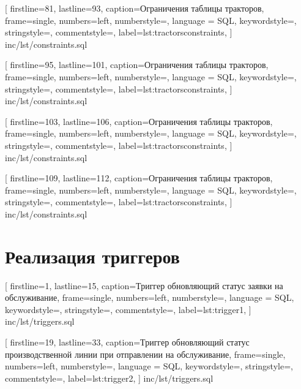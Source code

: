 
[
    firstline=81,
    lastline=93,
    caption=Ограничения таблицы тракторов,
    frame=single,
    numbers=left,
	numberstyle=\footnotesize\color{numbers},
    language = SQL,
    keywordstyle=\color{keywords},
	stringstyle=\color{strings},
	commentstyle=\color{comments},
    label={lst:tractorsconstraints},
]
{inc/lst/constraints.sql}


[
    firstline=95,
    lastline=101,
    caption=Ограничения таблицы тракторов,
    frame=single,
    numbers=left,
	numberstyle=\footnotesize\color{numbers},
    language = SQL,
    keywordstyle=\color{keywords},
	stringstyle=\color{strings},
	commentstyle=\color{comments},
    label={lst:tractorsconstraints},
]
{inc/lst/constraints.sql}


[
    firstline=103,
    lastline=106,
    caption=Ограничения таблицы тракторов,
    frame=single,
    numbers=left,
	numberstyle=\footnotesize\color{numbers},
    language = SQL,
    keywordstyle=\color{keywords},
	stringstyle=\color{strings},
	commentstyle=\color{comments},
    label={lst:tractorsconstraints},
]
{inc/lst/constraints.sql}


[
    firstline=109,
    lastline=112,
    caption=Ограничения таблицы тракторов,
    frame=single,
    numbers=left,
	numberstyle=\footnotesize\color{numbers},
    language = SQL,
    keywordstyle=\color{keywords},
	stringstyle=\color{strings},
	commentstyle=\color{comments},
    label={lst:tractorsconstraints},
]
{inc/lst/constraints.sql}

\section{Реализация триггеров}



[
    firstline=1,
    lastline=15,
    caption=Триггер\text{,} обновляющий статус заявки на обслуживание,
    frame=single,
    numbers=left,
	numberstyle=\footnotesize\color{numbers},
    language = SQL,
    keywordstyle=\color{keywords},
	stringstyle=\color{strings},
	commentstyle=\color{comments},
    label={lst:trigger1},
]
{inc/lst/triggers.sql}


[
    firstline=19,
    lastline=33,
    caption=Триггер\text{,} обновляющий статус производственной линии при отправлении на обслуживание,
    frame=single,
    numbers=left,
	numberstyle=\footnotesize\color{numbers},
    language = SQL,
    keywordstyle=\color{keywords},
	stringstyle=\color{strings},
	commentstyle=\color{comments},
    label={lst:trigger2},
]
{inc/lst/triggers.sql}


